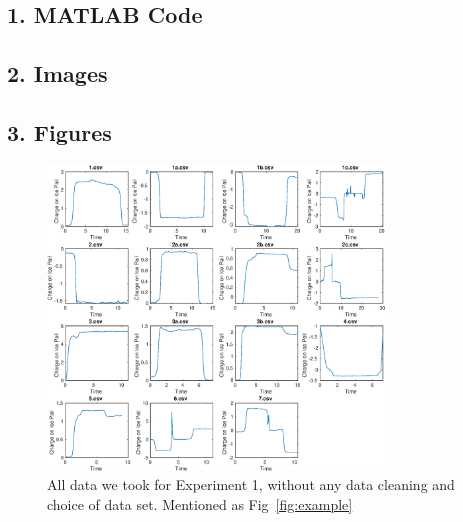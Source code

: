\documentclass[11pt]{article}
\begin{document}
\subsection{1. MATLAB Code}


\vspace{10pt} %


\vspace{10pt} %


\vspace{10pt} %

\subsection{2. Images}


\subsection{3. Figures}
\setcounter{figure}{0}
\begin{figure}[H]
\centering
\includegraphics[width=0.8\textwidth]{figure1.eps}
\caption{All data we took for Experiment 1, without any data cleaning and choice of data set. Mentioned as Fig~\ref{fig:example}}
\end{figure}
\end{document}
